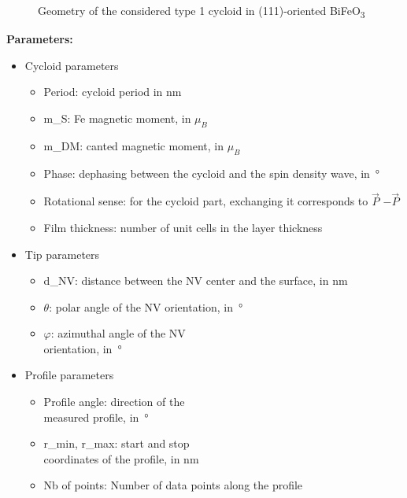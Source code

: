 \documentclass[a4paper,12pt]{article}
\newcommand{\BFO}{BiFeO\textsubscript{3}\ }
\begin{document}
\begin{figure}
  \caption{Geometry of the considered type 1 cycloid in (111)-oriented \BFO}
\end{figure}

\textbf{Parameters:}
\begin{itemize}
\item Cycloid parameters
  \begin{itemize}
  \item Period: cycloid period in \si{\nano\meter}
  \item m\_S: Fe magnetic moment, in $\mu_B$
  \item m\_DM: canted magnetic moment, in $\mu_B$
  \item Phase: dephasing between the cycloid and the spin density wave, in~°
  \item Rotational sense: for the cycloid part, exchanging it corresponds to $\vec{P}$ \textrightarrow $-\vec{P}$
  \item Film thickness: number of unit cells in the layer thickness
  \end{itemize}
\item Tip parameters
  \begin{itemize}
  \item d\_NV: distance between the NV center and the surface, in \si{\nano\meter}
  \item $\theta$: polar angle of the NV orientation, in~°
  \item $\varphi$: azimuthal angle of the NV\\ orientation, in~°
  \end{itemize}
\item Profile parameters
  \begin{itemize}
  \item Profile angle: direction of the\\ measured profile, in~°
  \item r\_min, r\_max: start and stop \\coordinates of the profile, in \si{\nano\meter}
  \item Nb of points: Number of data points along the profile
  \end{itemize}
\end{itemize}
\end{document}
